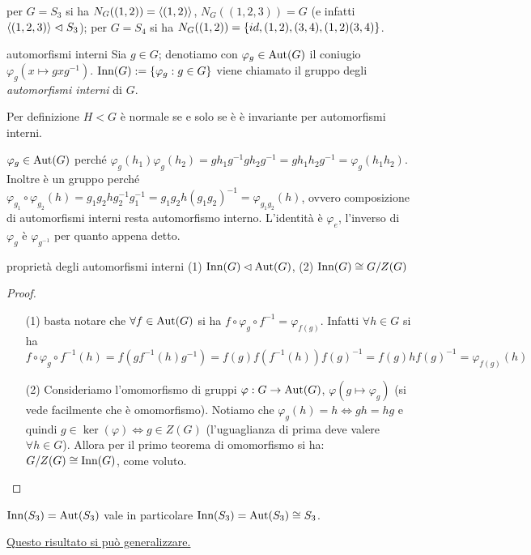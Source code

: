 \begin{example}
    per $G = S_3$ si ha $N_G((1,2)) = \langle (1,2) \rangle$, $N_G((1,2,3)) = G$ (e infatti $\langle (1,2,3) \rangle \vartriangleleft S_3$); per $G = S_4$ si ha $N_G((1,2)) = \left\{ id,(1,2),(3,4),(1,2)(3,4) \right\}$.
\end{example}
\begin{definition}{automorfismi interni}
    Sia $g \in G$; denotiamo con $\varphi_g \in \text{Aut}(G)$ il coniugio $\varphi_g(x \mapsto gxg^{-1})$. $\text{Inn}(G) := \{\varphi_g : g \in G\}$ viene chiamato il gruppo degli \textit{automorfismi interni} di $G$.
\end{definition}
Per definizione $H < G$ è normale se e solo se è è invariante per automorfismi interni.
\begin{bdef}
    $\varphi_g \in \text{Aut}(G)$ perché $\varphi_g(h_1)\varphi_g(h_2) = gh_1g^{-1}gh_2g^{-1} = gh_1h_2g^{-1} = \varphi_g(h_1h_2)$. Inoltre è un gruppo perché $\varphi_{g_1}\circ\varphi_{g_2}(h) = g_1g_2hg_2^{-1}g_1^{-1} = g_1g_2h(g_1g_2)^{-1} = \varphi_{g_1g_2}(h)$, ovvero composizione di automorfismi interni resta automorfismo interno. L'identità è $\varphi_e$, l'inverso di $\varphi_g$ è $\varphi_{g^{-1}}$ per quanto appena detto.
\end{bdef}
\begin{proposition}{proprietà degli automorfismi interni}
    (1) $\text{Inn}(G) \lhd \text{Aut}(G)$, (2) $\text{Inn}(G) \cong G/Z(G)$
\end{proposition}
\begin{proof} 
    \begin{enumerate}
    \item[(1)] basta notare che $\forall f \in \text{Aut}(G)$ si ha $f \circ \varphi_g \circ f^{-1} = \varphi_{f(g)}$. Infatti $\forall h \in G$ si ha $f \circ \varphi_g \circ f^{-1}(h) = f(gf^{-1}(h)g^{-1}) = f(g)f(f^{-1}(h))f(g)^{-1} = f(g)hf(g)^{-1} = \varphi_{f(g)}(h)$
    \item[(2)] Consideriamo l'omomorfismo di gruppi $\varphi: G \rightarrow \text{Aut}(G)$, $\varphi(g \mapsto \varphi_g)$ (si vede facilmente che è omomorfismo). Notiamo che $\varphi_g(h) = h \iff gh = hg$ e quindi $g \in \ker(\varphi) \iff g \in Z(G)$ (l'uguaglianza di prima deve valere $\forall h \in G$). Allora per il primo teorema di omomorfismo si ha: $G/Z(G) \cong \text{Inn}(G)$, come voluto. 
    \end{enumerate}
    \end{proof}
\begin{example2}{\normalfont $\text{Inn}(S_3) = \text{Aut}(S_3)$}
    vale in particolare  $\text{Inn}(S_3) = \text{Aut}(S_3) \cong S_3$.

    \hyperlink{InnSn}{Questo risultato si può generalizzare.}
\end{example2}

